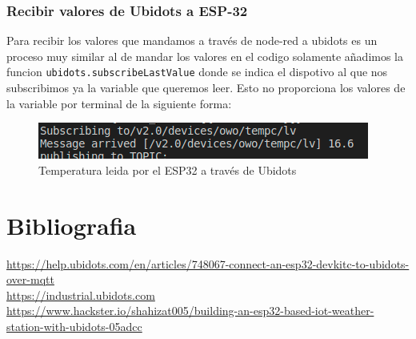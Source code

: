 \documentclass[11pt, letterpaper]{article}
\begin{document}
\subsubsection{Recibir valores de Ubidots a ESP-32}
Para recibir los valores que mandamos a través de node-red a ubidots es un proceso muy similar al de mandar los valores 
en el codigo solamente añadimos la funcion \texttt{ubidots.subscribeLastValue} donde se indica el dispotivo al que nos subscribimos ya la 
variable que queremos leer. Esto no proporciona los valores de la variable por terminal de la siguiente forma:

\begin{figure}[h]
	\centering
	\includegraphics[width=\textwidth]{Temperatura_recibida_ESP32.png}
	\caption{Temperatura leida por el ESP32 a través de Ubidots} 
	\label{fig:temp}
\end{figure}






\section{Bibliografia}

\url{https://help.ubidots.com/en/articles/748067-connect-an-esp32-devkitc-to-ubidots-over-mqtt}\\
\url{https://industrial.ubidots.com}\\
\url{https://www.hackster.io/shahizat005/building-an-esp32-based-iot-weather-station-with-ubidots-05adcc}\\
\end{document}
